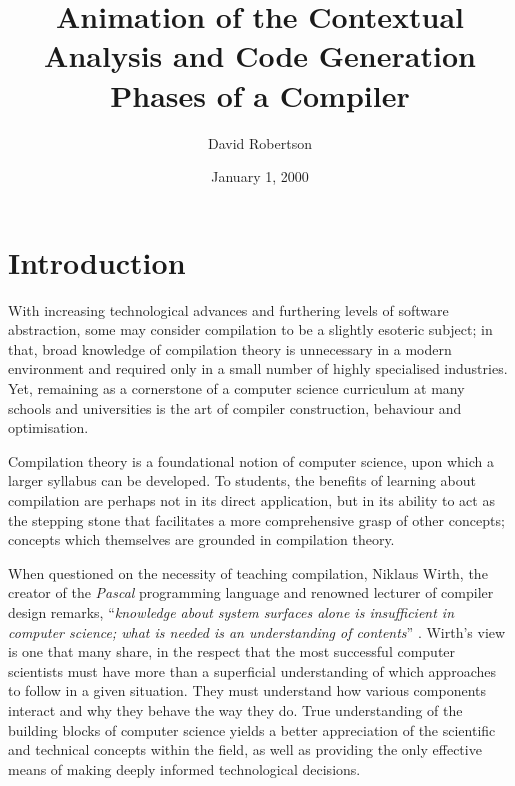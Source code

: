 \documentclass{l4proj}
\begin{document}
\title{Animation of the Contextual Analysis and Code Generation Phases of a Compiler}
\author{David Robertson}
\date{January 1, 2000}
\maketitle

\begin{abstract}

\end{abstract}

\educationalconsent
%
%
\tableofcontents

\chapter{Introduction}
With increasing technological advances and furthering levels of software abstraction, some may consider compilation to be a slightly esoteric subject; in that, broad knowledge of compilation theory is unnecessary in a modern environment and required only in a small number of highly specialised industries. Yet, remaining as a cornerstone of a computer science curriculum at many schools and universities is the art of compiler construction, behaviour and optimisation.

Compilation theory is a foundational notion of computer science, upon which a larger syllabus can be developed. To students, the benefits of learning about compilation are perhaps not in its direct application, but in its ability to act as the stepping stone that facilitates a more comprehensive grasp of other concepts; concepts which themselves are grounded in compilation theory. 

When questioned on the necessity of teaching compilation, Niklaus Wirth, the creator of the \textit{Pascal} programming language and renowned lecturer of compiler design remarks, ``\textit{knowledge about system surfaces alone is insufficient in computer science; what is needed is an understanding of contents}'' \cite{WirthTheory}. Wirth's view is one that many share, in the respect that the most successful computer scientists must have more than a superficial understanding of which approaches to follow in a given situation. They must understand how various components interact and why they behave the way they do. True understanding of the building blocks of computer science yields a better appreciation of the scientific and technical concepts within the field, as well as providing the only effective means of making deeply informed technological decisions.
\end{document}

